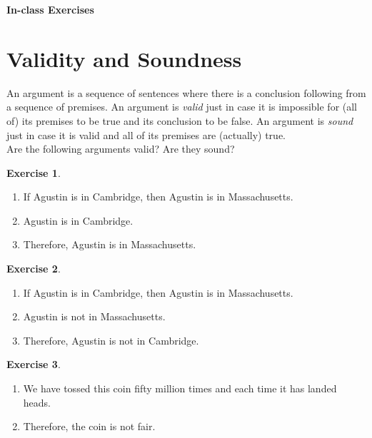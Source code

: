 \documentclass[11pt]{article}
\theoremstyle{definition}
\newtheorem{exer}{Exercise}
\begin{document}




\begin{center}
{\LARGE \bf In-class Exercises}
\end{center}

\smallskip

\section{Validity and Soundness}

\noindent
An argument is a sequence of sentences where there is a conclusion following from a sequence of premises. An argument is \textit{valid} just in case it is impossible for (all of) its premises to be true and its conclusion to be false. An argument is \textit{sound} just in case it is valid and all of its premises are (actually) true. \\

\noindent
Are the following arguments valid? Are they sound?

\begin{exer}
\hfill
\begin{enumerate}
\item If Agustin is in Cambridge, then Agustin is in Massachusetts. 
\item Agustin is in Cambridge.
\item Therefore, Agustin is in Massachusetts. 
\end{enumerate}
\end{exer}

\begin{exer}
\hfill
\begin{enumerate}
\item If Agustin is in Cambridge, then Agustin is in Massachusetts. 
\item Agustin is not in Massachusetts. 
\item Therefore, Agustin is not in Cambridge. 
\end{enumerate}
\end{exer}

\begin{exer}
\hfill
\begin{enumerate}
\item We have tossed this coin fifty million times and each time it has landed heads. 
\item Therefore, the coin is not fair. 
\end{enumerate}
\end{exer}
\end{document}
